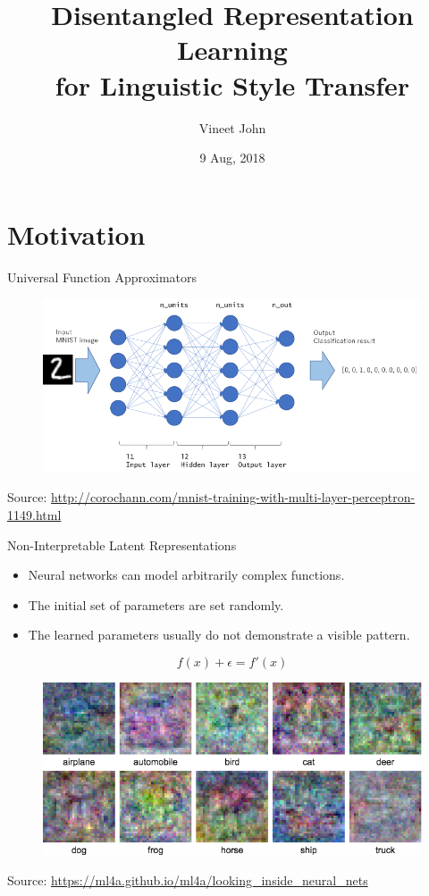 \documentclass[aspectratio=169]{beamer}
\title{
	Disentangled Representation Learning\\
	for Linguistic Style Transfer}
\date{9 Aug, 2018}
\author{Vineet John}
\institute{University of Waterloo}
\newcommand{\imgsrc}[1]{\tiny{Source: #1}}
\begin{document}
\maketitle
\graphicspath{{images/}}

\section{Motivation}

\begin{frame}{Universal Function Approximators}
	\centering
	\begin{figure}[ht]
		\includegraphics[width=\linewidth]{mlp-network}
	\end{figure}
	\imgsrc{\url{http://corochann.com/mnist-training-with-multi-layer-perceptron-1149.html}}
\end{frame}

\begin{frame}{Non-Interpretable Latent Representations}
	\begin{itemize}
		\item Neural networks can model arbitrarily complex functions.
		\item The initial set of parameters are set randomly.
		\item The learned parameters usually do not demonstrate a visible pattern.
	\end{itemize}
	$$f(x) + \epsilon = f'(x)$$
	\centering
	\begin{figure}[ht]
		\includegraphics[width=0.5\linewidth]{uninterpretable-weights}
	\end{figure}
	\imgsrc{\url{https://ml4a.github.io/ml4a/looking_inside_neural_nets}}
\end{frame}
\end{document}
